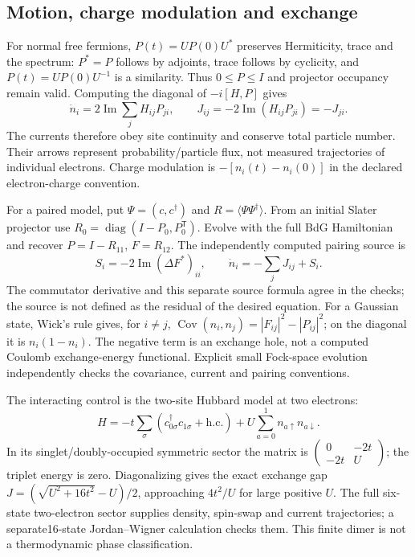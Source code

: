 \documentclass[11pt,oneside,openany]{book}
\theoremstyle{definition}\newtheorem{definition}[theorem]{Definition}
\theoremstyle{remark}\newtheorem{remark}[theorem]{Remark}
\begin{document}
\subsection{Motion, charge modulation and exchange}
For normal free fermions, $P(t)=UP(0)U^*$ preserves Hermiticity, trace and the
spectrum: $P^*=P$ follows by adjoints, trace follows by cyclicity, and
$P(t)=U P(0)U^{-1}$ is a similarity. Thus $0\leq P\leq I$ and projector
occupancy remain valid. Computing the diagonal of $-i[H,P]$ gives
\[
 \dot n_i=2\operatorname{Im}\sum_jH_{ij}P_{ji},\qquad
 J_{ij}=-2\operatorname{Im}(H_{ij}P_{ji})=-J_{ji}.
\]
The currents therefore obey site continuity and conserve total particle number.
Their arrows represent probability/particle flux, not measured trajectories of
individual electrons. Charge modulation is $-[n_i(t)-n_i(0)]$ in the declared
electron-charge convention.

For a paired model, put $\Psi=(c,c^\dagger)$ and
$R=\langle\Psi\Psi^\dagger\rangle$. From an initial Slater projector use
$R_0=\operatorname{diag}(I-P_0,P_0^{\mathsf T})$. Evolve with the full BdG
Hamiltonian and recover $P=I-R_{11}$, $F=R_{12}$.
The independently computed pairing source is
\[
 S_i=-2\operatorname{Im}(\Delta F^*)_{ii},\qquad
 \dot n_i=-\sum_jJ_{ij}+S_i.
\]
The commutator derivative and this separate source formula agree in the
checks; the source is not defined as the residual of the desired equation.
For a Gaussian state, Wick's rule gives, for $i\ne j$,
$\operatorname{Cov}(n_i,n_j)=|F_{ij}|^2-|P_{ij}|^2$; on the diagonal it is
$n_i(1-n_i)$. The negative term is an exchange hole, not a computed Coulomb
exchange-energy functional. Explicit small Fock-space evolution independently
checks the covariance, current and pairing conventions.

The interacting control is the two-site Hubbard model at two electrons:
\[
 H=-t\sum_\sigma(c_{0\sigma}^\dagger c_{1\sigma}+\mathrm{h.c.})
   +U\sum_{a=0}^1n_{a\uparrow}n_{a\downarrow}.
\]
In its singlet/doubly-occupied symmetric sector the matrix is
$\left(\begin{smallmatrix}0&-2t\\-2t&U\end{smallmatrix}\right)$;
the triplet energy is zero. Diagonalizing gives the exact exchange gap
$J=(\sqrt{U^2+16t^2}-U)/2$, approaching $4t^2/U$ for large positive $U$.
The full six-state two-electron sector supplies density, spin-swap and current
trajectories; a separate16-state Jordan--Wigner calculation checks them.
This finite dimer is not a thermodynamic phase classification.
\end{document}
